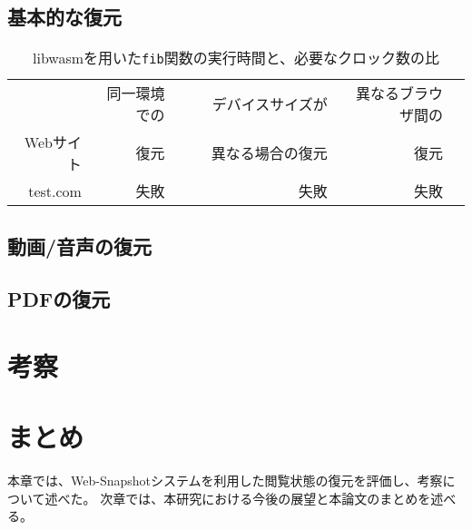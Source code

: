 \subsection{基本的な復元}
\begin{table}[htbp]
  \caption{libwasmを用いた{\tt fib}関数の実行時間と、必要なクロック数の比}
  \label{tab:fib_time}
  \begin{center}
    \begin{tabular}{rrrrr}
      \hline
      & 同一環境での & デバイスサイズが       & 異なるブラウザ間の \\
       Webサイト & 復元       & 異なる場合の復元　　　　 & 復元 \\ \hline \hline
      test.com & 失敗         & 失敗 &  失敗 \\ \hline
    \end{tabular}
  \end{center}
\end{table}

\subsection{動画/音声の復元}

\subsection{PDFの復元}

\section{考察}

\section{まとめ}
本章では、Web-Snapshotシステムを利用した閲覧状態の復元を評価し、考察について述べた。
次章では、本研究における今後の展望と本論文のまとめを述べる。
